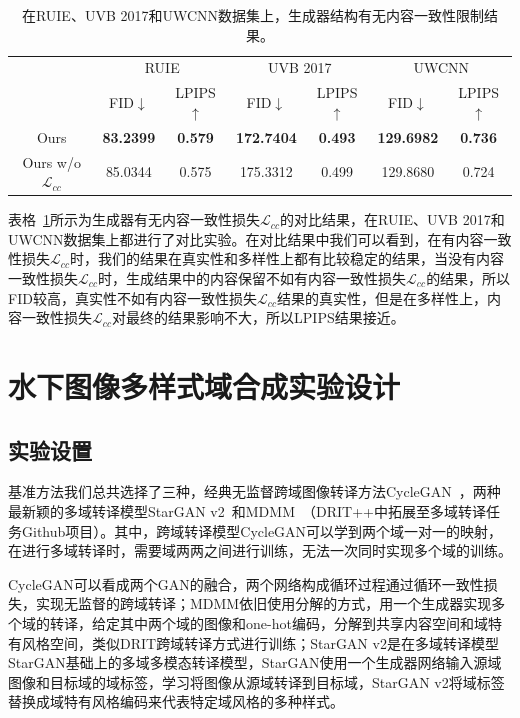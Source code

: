 \begin{table}[htbp]
  \centering
  \caption{在RUIE、UVB 2017和UWCNN数据集上，生成器结构有无内容一致性限制结果。}
    \begin{tabular}{c|c|c|c|c|c|c}
    \hline
    \multirow{2}[3]{*}{} & \multicolumn{2}{c|}{RUIE} & \multicolumn{2}{c|}{UVB 2017} & \multicolumn{2}{c}{UWCNN} \\
\cmidrule{2-7}          & \multicolumn{1}{c|}{FID$\downarrow$ } & \multicolumn{1}{c|}{LPIPS$\uparrow$} & \multicolumn{1}{c|}{FID$\downarrow$ } & \multicolumn{1}{c|}{LPIPS$\uparrow$} & \multicolumn{1}{c|}{FID$\downarrow$ } & LPIPS$\uparrow$ \\
    \midrule
    Ours  & \textbf{83.2399} & \textbf{0.579} & \textbf{172.7404} & \textbf{0.493} & \textbf{129.6982} & \textbf{0.736} \\
    Ours w/o $\mathcal{L}_{cc}$ & 85.0344 & 0.575 & 175.3312 & 0.499 & 129.8680 & 0.724 \\
    \hline
    \end{tabular}%
  \label{tab:ablation_modal_lcc}%
\end{table}%

表格~\ref{tab:ablation_modal_lcc}所示为生成器有无内容一致性损失$\mathcal{L}_{cc}$的对比结果，在RUIE、UVB 2017和UWCNN数据集上都进行了对比实验。在对比结果中我们可以看到，在有内容一致性损失$\mathcal{L}_{cc}$时，我们的结果在真实性和多样性上都有比较稳定的结果，当没有内容一致性损失$\mathcal{L}_{cc}$时，生成结果中的内容保留不如有内容一致性损失$\mathcal{L}_{cc}$的结果，所以FID较高，真实性不如有内容一致性损失$\mathcal{L}_{cc}$结果的真实性，但是在多样性上，内容一致性损失$\mathcal{L}_{cc}$对最终的结果影响不大，所以LPIPS结果接近。

\section{水下图像多样式域合成实验设计}
\subsection{实验设置}
基准方法我们总共选择了三种，经典无监督跨域图像转译方法CycleGAN~\cite{zhu2017unpaired}，两种最新颖的多域转译模型StarGAN v2~\cite{choi2020stargan}和MDMM~\cite{lee2020drit++}（DRIT++中拓展至多域转译任务Github项目）。其中，跨域转译模型CycleGAN可以学到两个域一对一的映射，在进行多域转译时，需要域两两之间进行训练，无法一次同时实现多个域的训练。

CycleGAN可以看成两个GAN的融合，两个网络构成循环过程通过循环一致性损失，实现无监督的跨域转译；MDMM依旧使用分解的方式，用一个生成器实现多个域的转译，给定其中两个域的图像和one-hot编码，分解到共享内容空间和域特有风格空间，类似DRIT跨域转译方式进行训练；StarGAN v2是在多域转译模型StarGAN基础上的多域多模态转译模型，StarGAN使用一个生成器网络输入源域图像和目标域的域标签，学习将图像从源域转译到目标域，StarGAN v2将域标签替换成域特有风格编码来代表特定域风格的多种样式。

